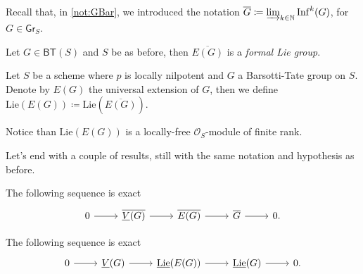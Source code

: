 \noindent
Recall that, in \cref{not:GBar}, we introduced the notation
$\overline{G} \coloneqq \varinjlim_{k \in \mathbb{N}} \mathrm{Inf}^k(G)$,
for $G \in \mathsf{Gr}_S$.


\begin{prop}\label{prop:ExtFLG}
	Let $G \in \mathsf{BT}(S)$ and $S$ be as before,
	then $\overline{E(G)}$ is a {\em formal Lie group}.
\end{prop} 


\begin{defn}[]
	Let $S$ be a scheme where $p$ is locally nilpotent and $G$
	a Barsotti-Tate group on $S$.
	Denote by $E(G)$ the universal extension of $G$, then we define
	$\mathrm{Lie}(E(G)) \coloneqq \mathrm{Lie}(\overline{E(G)})$.
\end{defn}


\begin{rem}[]
	Notice than $\mathrm{Lie}(E(G))$ is a locally-free
	$\mathcal{O}_{ S }$-module of finite rank.
\end{rem}


\noindent
Let's end with a couple of results, still with the same notation and hypothesis as before.
\begin{prop}
	The following sequence is exact
	\begin{equation*}
	\begin{tikzcd}
		0 \arrow[r, "", rightarrow] &
		\overline{\underline{V}(G)} \arrow[r, "", rightarrow] &
		\overline{E(G)} \arrow[r, "", rightarrow] &
		\overline{G} \arrow[r, "", rightarrow] &
		0
	.\end{tikzcd}
	\end{equation*}
\end{prop} 


\begin{prop}
	The following sequence is exact
	\begin{equation*}
	\begin{tikzcd}
		0 \arrow[r, "", rightarrow] &
		\underline{V}(G) \arrow[r, "", rightarrow] &
		\underline{\mathrm{Lie}}(E(G)) \arrow[r, "", rightarrow] &
		\underline{\mathrm{Lie}}(G) \arrow[r, "", rightarrow] &
		0
	.\end{tikzcd}
	\end{equation*}
\end{prop} 



